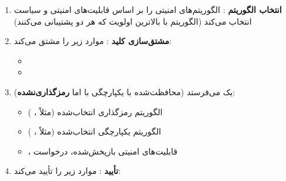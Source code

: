 \begin{enumerate}
\def\labelenumi{\arabic{enumi}.}
\tightlist
\item
  \textbf{انتخاب الگوریتم }:  الگوریتم‌های امنیتی  را بر اساس قابلیت‌های امنیتی  و سیاست  انتخاب می‌کند (الگوریتم با بالاترین اولویت که هر دو پشتیبانی می‌کنند)
\item
  \textbf{مشتق‌سازی کلید }:  موارد زیر را مشتق می‌کند:

  \begin{itemize}
  \tightlist
  \item
  \item
  \end{itemize}
\item
   یک  می‌فرستد (محافظت‌شده با یکپارچگی با  اما \textbf{رمزگذاری‌نشده}):

  \begin{itemize}
  \tightlist
  \item
    الگوریتم رمزگذاری  انتخاب‌شده (مثلاً ، )
  \item
    الگوریتم یکپارچگی  انتخاب‌شده (مثلاً ، )
  \item
    ، قابلیت‌های امنیتی  بازپخش‌شده، درخواست 
  \end{itemize}
\item
  \textbf{تأیید }:  موارد زیر را تأیید می‌کند:


\end{enumerate}
